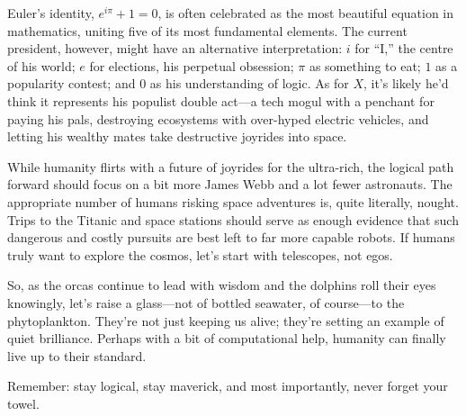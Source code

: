 \documentclass[12pt]{article}
\begin{document}
Euler’s identity, \(e^{i\pi} + 1 = 0\), is often celebrated as the most beautiful equation in mathematics, uniting five of its most fundamental elements. The current president, however, might have an alternative interpretation: \(i\) for “I,” the centre of his world; \(e\) for elections, his perpetual obsession; \(\pi\) as something to eat; \(1\) as a popularity contest; and \(0\) as his understanding of logic. As for \(X\), it’s likely he’d think it represents his populist double act—a tech mogul with a penchant for paying his pals, destroying ecosystems with over-hyped electric vehicles, and letting his wealthy mates take destructive joyrides into space.

While humanity flirts with a future of joyrides for the ultra-rich, the logical path forward should focus on a bit more James Webb and a lot fewer astronauts. The appropriate number of humans risking space adventures is, quite literally, nought. Trips to the Titanic and space stations should serve as enough evidence that such dangerous and costly pursuits are best left to far more capable robots. If humans truly want to explore the cosmos, let’s start with telescopes, not egos.

So, as the orcas continue to lead with wisdom and the dolphins roll their eyes knowingly, let’s raise a glass—not of bottled seawater, of course—to the phytoplankton. They’re not just keeping us alive; they’re setting an example of quiet brilliance. Perhaps with a bit of computational help, humanity can finally live up to their standard.

Remember: stay logical, stay maverick, and most importantly, never forget your towel.
\end{document}
